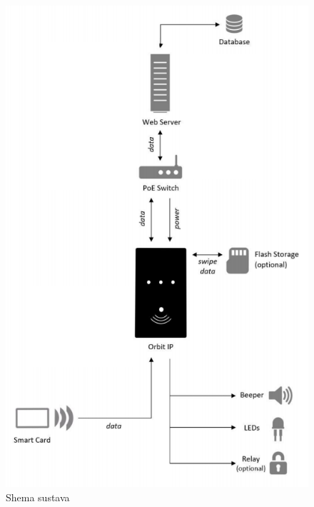 \documentclass[times, utf8, zavrsni]{fer}
\begin{document}
\begin{figure}[h]
\includegraphics[scale=0.5]{arhitektura.png}
\centering
\caption{Shema sustava}
\centering
\end{figure}
\end{document}

